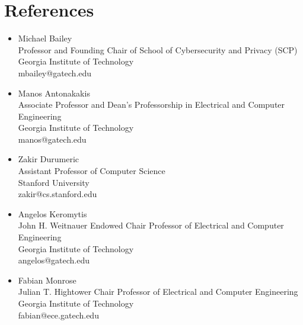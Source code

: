 \documentclass[10pt,singlecolumn]{article} %
\begin{document}
\newpage

\section{References}

\begin{itemize}[label={}, leftmargin=*]
\setlength\itemsep{0.2em}
\item Michael Bailey\\
Professor and Founding Chair of School of Cybersecurity and Privacy (SCP)\\
Georgia Institute of Technology\\
mbailey@gatech.edu

\item Manos Antonakakis\\
Associate Professor and Dean's Professorship in Electrical and Computer Engineering\\
Georgia Institute of Technology\\
manos@gatech.edu


\item Zakir Durumeric \\
Assistant Professor of Computer Science \\
Stanford University \\
zakir@cs.stanford.edu 

\item Angelos Keromytis \\
John H. Weitnauer Endowed Chair Professor of Electrical and Computer Engineering \\
Georgia Institute of Technology \\
angelos@gatech.edu 

\item Fabian Monrose \\
Julian T. Hightower Chair Professor of Electrical and Computer Engineering \\
Georgia Institute of Technology \\
fabian@ece.gatech.edu 

\end{itemize}



%
%	
	
\end{document}
